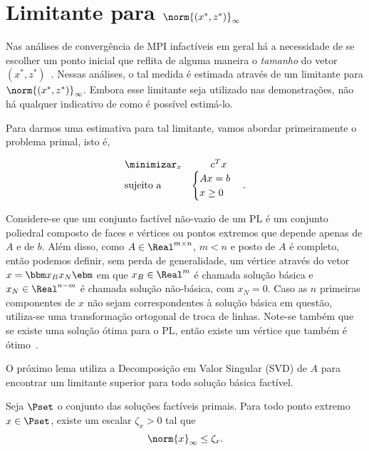 
 \section{Limitante para $\norm{(x^*,z^*)}_\infty$}


Nas análises de convergência de \ac{MPI} infactíveis em geral há  a
necessidade de se escolher um ponto inicial que reflita de alguma maneira o
\emph{tamanho} do vetor $(x^*,z^*)$~\cite{Zhang:2006ic,Wright:1994jd}.
Nessas análises, o tal medida  é estimada através de um
limitante para $\norm{(x^*,z^*)}_\infty$. Embora esse limitante seja utilizado nas
demonstrações, não há qualquer indicativo de como é possível estimá-lo.


Para darmos uma estimativa para tal limitante, vamos abordar primeiramente o
problema primal, isto é,

\begin{equation} %
	\begin{array}{lc}
\displaystyle \minimizar_{x} & c^Tx \\
\text{sujeito a} &\begin{cases} Ax = b \\
				 x \geq 0	
				 \end{cases}.
\end{array}  
\label{eq:primal-bound}
\end{equation}

Considere-se que um conjunto factível não-vazio de um
\ac{PL} é um conjunto poliedral composto de faces e vértices ou pontos
extremos que depende apenas de $A$ e de $b$.  Além disso, como
$A\in\Real^{m\times n}$, $m<n$ e posto de $A$ é completo, então podemos definir,
sem perda de generalidade, um vértice através do vetor $x  = \bbm x _B \\
x _N\ebm$ em que $x _B\in\Real^m$ é chamada solução básica  e
$x _N\in\Real^{n-m}$ é chamada solução não-básica, com $x _N = 0$. Caso as
$n$ primeiras componentes de $x $ não sejam correspondentes à solução básica
em questão, utiliza-se uma transformação ortogonal de troca de linhas.  Note-se
também que se existe uma solução ótima para o \ac{PL}, então existe um vértice que também é ótimo~\cite{Bazaraa:2009uu}.

O próximo lema utiliza a Decomposição em Valor Singular (SVD) de $A$ para
encontrar um limitante superior para todo solução básica factível.



\begin{lema}
\label{lemma:bound-xb}
Seja  $\Pset$ o conjunto das soluções factíveis primais. Para todo ponto extremo
$x \in\Pset$, existe um escalar $\zeta_x>0$ tal que
\begin{equation}
\label{eq:inequalityzetax}
\norm{x }_\infty \leq \zeta_x.
\end{equation}
\end{lema}


